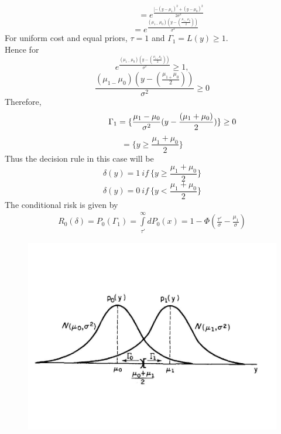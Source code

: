 \documentclass[a4paper,english,12pt]{article}
\begin{document}
\begin{exmp}
\begin{equation}
~~~~~~~~~~~~~~~~~~~~~={e^{\frac{{[ - {{(y - {\mu _1})}^2} + {{(y - {\mu _0})}^2}}}{{2{\sigma ^2}}}}}
\end{equation}
\begin{equation}
	~~~~~~~~~~~~~~~={e^{\frac{{({\mu _{1 - }}{\mu _0})\left( {y - (\frac{{{\mu _{1 + }}{\mu _0}}}{2})} \right)}}{{{\sigma ^2}}}}}
\end{equation}
For uniform cost and equal priors, $\tau = 1$ and $\Gamma_1 = {L(y)\geq1}$.\\ Hence for 
\begin{equation}
	{e^{\frac{{({\mu _{1 - }}{\mu _0})\left( {y - (\frac{{{\mu _{1 + }}{\mu _0}}}{2})} \right)}}{{{\sigma ^2}}}}}\geq 1,
\end{equation}
\begin{equation}
	{\frac{{({\mu _{1 - }}{\mu _0})\left( {y - (\frac{{{\mu _{1 + }}{\mu _0}}}{2})} \right)}}{{{\sigma ^2}}}}\geq 0
\end{equation}
Therefore,
\begin{equation}
{~~~~~~~~~~~~~~~\Gamma _1} = \{ \frac{{{\mu _1} - {\mu _0}}}{{{\sigma ^2}}}(y - \frac{{({\mu _1} + {\mu _0})}}{2})\}\geq0 \\
\end{equation}
\begin{equation}
=\{ y \ge \frac{{{\mu _1} + {\mu _0}}}{2}\}
\end{equation}
Thus the decision rule in this case will be\\
\begin{equation}
\delta(y)= 1 ~ if~ \{ y \ge \frac{{{\mu _1} + {\mu _0}}}{2}\}
\end{equation}
\begin{equation}
\delta(y)= 0 ~ if~ \{ y < \frac{{{\mu _1} + {\mu _0}}}{2}\}
\end{equation}
The conditional risk is given by\\
\begin{eqnarray}
R_0(\delta)= P_0(\Gamma_1)
=\int\limits_{{\tau'}}^\infty  {d{P_0}(x)}
=1 - \Phi (\frac{{\tau '}}{\sigma } - \frac{{{\mu _1}}}{\sigma })
\end{eqnarray}
\begin{figure}[h]
\centering
\includegraphics[width=0.9\linewidth]{"Figures/Gaussian Error"}

\end{figure}
\end{exmp}
\end{document}
